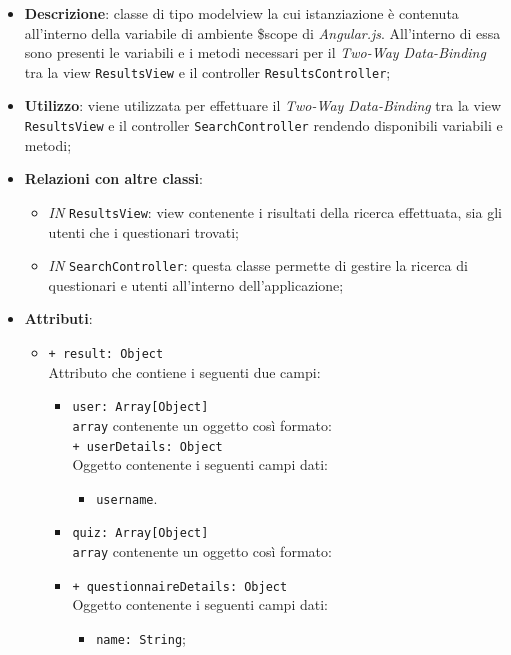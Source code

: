 	\begin{itemize}
		\item \textbf{Descrizione}: classe di tipo modelview la cui istanziazione è contenuta all'interno della variabile di ambiente \$scope di \textit{Angular.js}. All'interno di essa sono presenti le variabili e i metodi necessari per il \textit{Two-Way Data-Binding} tra la view \texttt{ResultsView} e il controller \texttt{ResultsController};
		\item \textbf{Utilizzo}: viene utilizzata per effettuare il \textit{Two-Way Data-Binding} tra la view \texttt{ResultsView} e il controller \texttt{SearchController} rendendo disponibili variabili e metodi;
		\item \textbf{Relazioni con altre classi}: 
		\begin{itemize}
			\item \textit{IN} \texttt{ResultsView}: view contenente i risultati della ricerca effettuata, sia gli utenti che i questionari trovati; 
			\item \textit{IN} \texttt{SearchController}: questa classe permette di gestire la ricerca di questionari e utenti all’interno dell’applicazione;
		\end{itemize}
		\item \textbf{Attributi}: 
		\begin{itemize}
			\item \texttt{+ result: Object} \\ Attributo che contiene i seguenti due campi: 
			\begin{itemize}
				\item \texttt{user: Array[Object]}\\ \texttt{array} contenente un oggetto così formato:\\
				\texttt{+ userDetails: Object} \\ Oggetto contenente i seguenti campi dati:
				\begin{itemize}
					\item \texttt{username}.
				\end{itemize}
				\item \texttt{quiz: Array[Object]}\\ \texttt{array} contenente un oggetto così formato:\\
				\item \texttt{+ questionnaireDetails: Object} \\ Oggetto contenente i seguenti campi dati:
				\begin{itemize}
					\item \texttt{name: String};

\end{itemize}
\end{itemize}
\end{itemize}
\end{itemize}
